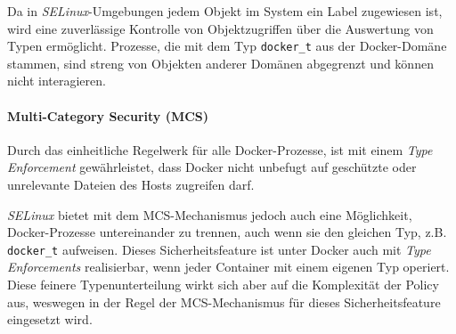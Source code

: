 \documentclass[../main.tex]{subfiles}
\begin{document}
					Da in \emph{SELinux}-Umgebungen jedem Objekt im System ein Label zugewiesen ist, wird eine zuverlässige Kontrolle von Objektzugriffen über die Auswertung von Typen ermöglicht. Prozesse, die mit dem Typ \texttt{docker\_t} aus der Docker-Domäne stammen, sind streng von Objekten anderer Domänen abgegrenzt und können nicht interagieren.


				\paragraph{Multi-Category Security (MCS)}
					Durch das einheitliche Regelwerk für alle Docker-Prozesse, ist mit einem \emph{Type Enforcement} gewährleistet, dass Docker nicht unbefugt auf geschützte oder unrelevante Dateien des Hosts zugreifen darf.

					\emph{SELinux} bietet mit dem MCS-Mechanismus jedoch auch eine Möglichkeit, Docker-Prozesse untereinander zu trennen, auch wenn sie den gleichen Typ, z.B. \texttt{docker\_t} aufweisen. Dieses Sicherheitsfeature ist unter Docker auch mit \emph{Type Enforcements} realisierbar, wenn jeder Container mit einem eigenen Typ operiert. Diese feinere Typenunterteilung wirkt sich aber auf die Komplexität der Policy aus, weswegen in der Regel der MCS-Mechanismus für dieses Sicherheitsfeature eingesetzt wird.
\end{document}
